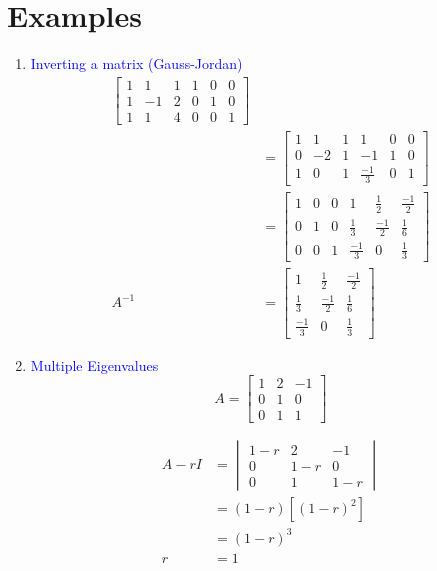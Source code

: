 \documentclass[twocolumn,draft]{article}
\newcommand{\bt}[1]{\textcolor{blue}{#1}}
\begin{document}
  \section*{Examples}
  
  \begin{enumerate}
  	\item \bt{Inverting a matrix (Gauss-Jordan)}
		\begin{align*}
			\left[
			\begin{array}{ccc|ccc}
				1 & 1 & 1  & 1 & 0 & 0 \\
				1 & -1 & 2 & 0 & 1 & 0 \\
				1 & 1 & 4  & 0 & 0 & 1
			\end{array} \right] \\
			&= 
			\left[
			\begin{array}{ccc|ccc}
				1 & 1 & 1  & 1 & 0 & 0 \\
				0 & -2 & 1 & -1 & 1 & 0 \\
				1 & 0 & 1  & \frac{-1}{3} & 0 & 1
			\end{array} \right] \\
			&= 
			\left[
			\begin{array}{ccc|ccc}
				1 & 0 & 0  & 1 			  & \frac{1}{2} 	& \frac{-1}{2} \\
				0 & 1 & 0  & \frac{1}{3}  & \frac{-1}{2} 	& \frac{1}{6} \\
				0 & 0 & 1  & \frac{-1}{3} & 0 				& \frac{1}{3}
			\end{array} \right] \\
				A^{-1} &= 
				\begin{bmatrix}
					1 			  & \frac{1}{2} 	& \frac{-1}{2} \\
					\frac{1}{3}  & \frac{-1}{2} 	& \frac{1}{6} \\
					\frac{-1}{3} & 0 				& \frac{1}{3}
				\end{bmatrix}
		\end{align*}
	
	\item \bt{Multiple Eigenvalues}
		\begin{equation*}
			A = 
			\begin{bmatrix}
				1 & 2 & -1 \\
				0 & 1 & 0 \\
				0 & 1 & 1
			\end{bmatrix}
		\end{equation*}
		
		\begin{align*}
			A-rI &=
			\begin{vmatrix}
				1-r & 2 & -1 \\
				0 & 1-r & 0 \\
				0 & 1 & 1-r
			\end{vmatrix} \\
			&= (1-r)\left[(1-r)^{2}\right] \\
			&= (1-r)^{3} \\
			r &= 1 \tag*{multiplicity 3}
		\end{align*}


\end{enumerate}
\end{document}
